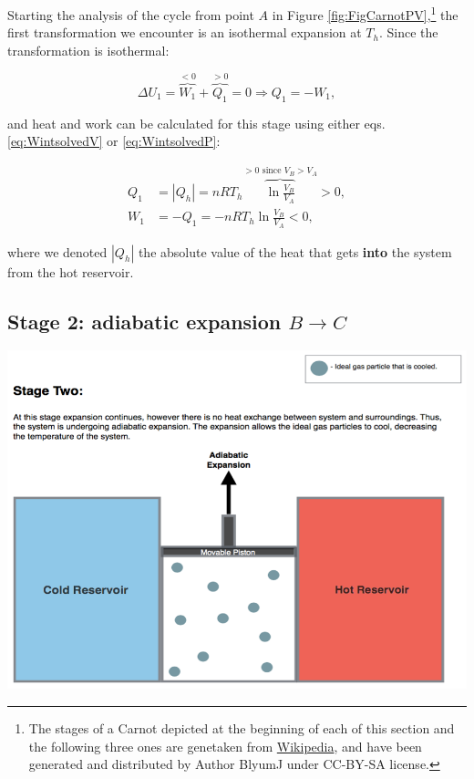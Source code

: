 \documentclass[
  9pt,
]{extbook}
\theoremstyle{definition}
\theoremstyle{definition}
\theoremstyle{definition}
\theoremstyle{remark}
\begin{document}
Starting the analysis of the cycle from point \(A\) in Figure \ref{fig:FigCarnotPV},\footnote{The stages of a Carnot depicted at the beginning of each of this section and the following three ones are genetaken from \href{https://en.wikipedia.org/wiki/Carnot_cycle}{Wikipedia}, and have been generated and distributed by Author BlyumJ under CC-BY-SA license.} the first transformation we encounter is an isothermal expansion at \(T_h\). Since the transformation is isothermal:

\begin{equation}
\Delta U_1 = \overbrace{W_1}^{<0} + \overbrace{Q_1}^{>0} = 0 \Rightarrow Q_1 = -W_1,
  \label{eq:CCst1}
\end{equation}

and heat and work can be calculated for this stage using either eqs. \eqref{eq:WintsolvedV} or \eqref{eq:WintsolvedP}:

\begin{equation}
\begin{aligned}
 Q_1 & = \left| Q_h \right|  = nRT_h \overbrace{\ln \frac{V_B}{V_A}}^{>0 \text{ since } V_B>V_A} > 0, \\
 W_1 & = -Q_1 = - nRT_h \ln \frac{V_B}{V_A} < 0,
\end{aligned}
  \label{eq:CCst1b}
\end{equation}

where we denoted \(\left| Q_h \right|\) the absolute value of the heat that gets \textbf{into} the system from the hot reservoir.

\hypertarget{CCstage2}{%
\subsection{\texorpdfstring{Stage 2: adiabatic expansion \(B \rightarrow C\)}{Stage 2: adiabatic expansion B \textbackslash rightarrow C}}\label{CCstage2}}

\begin{center}\includegraphics[width=0.7\linewidth]{./img/OEP_Figures.007b} \end{center}
\end{document}
